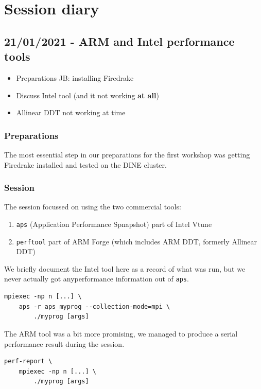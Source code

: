 \documentclass[a4paper,11pt]{article}
\newenvironment{jacknotes}{\color{red}\renewcommand{\labelitemi}{$\star$}\begin{itemize}}{\end{itemize}}
\begin{document}
\clearpage
\section{Session diary}
\label{sec:diary}
\subsection*{21/01/2021 - ARM and Intel performance tools}
\label{ssec:arm_intel}
\begin{jacknotes}
	\item Preparations JB: installing Firedrake
	\item Discuss Intel tool (and it not working \textbf{at all})
	\item Allinear DDT not working at time
\end{jacknotes}
\subsubsection*{Preparations}
The most essential step in our preparations for the first workshop was getting Firedrake installed and tested on the DINE cluster.

\subsubsection*{Session}
The session focussed on using the two commercial tools:
\begin{enumerate}
	\item \verb`aps` (Application Performance Spnapshot) part of Intel Vtune
	\item \verb`perftool` part of ARM Forge (which includes ARM DDT, formerly Allinear DDT)
\end{enumerate}

We briefly document the Intel tool here as a record of what was run, but we never actually got anyperformance information out of \verb`aps`.
\begin{lstlisting}
mpiexec -np n [...] \
	aps -r aps_myprog --collection-mode=mpi \
		./myprog [args]
\end{lstlisting}

The ARM tool was a bit more promising, we managed to produce a serial performance result during the session.
\begin{lstlisting}
perf-report \
	mpiexec -np n [...] \
		./myprog [args]
\end{lstlisting}
\end{document}
